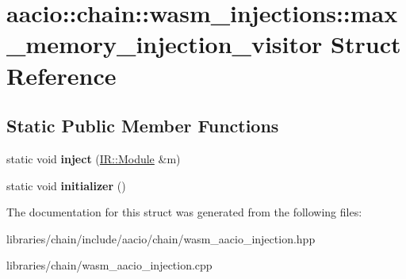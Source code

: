 \hypertarget{structaacio_1_1chain_1_1wasm__injections_1_1max__memory__injection__visitor}{}\section{aacio\+:\+:chain\+:\+:wasm\+\_\+injections\+:\+:max\+\_\+memory\+\_\+injection\+\_\+visitor Struct Reference}
\label{structaacio_1_1chain_1_1wasm__injections_1_1max__memory__injection__visitor}
\subsection*{Static Public Member Functions}
\begin{DoxyCompactItemize}
\item 
\mbox{\label{structaacio_1_1chain_1_1wasm__injections_1_1max__memory__injection__visitor_aaf9c8b57238ba235669a73e03e057e6c}} 
static void {\bfseries inject} (\mbox{\hyperlink{struct_i_r_1_1_module}{I\+R\+::\+Module}} \&m)
\item 
\mbox{\label{structaacio_1_1chain_1_1wasm__injections_1_1max__memory__injection__visitor_a57685045f399e123955fd605998c251b}} 
static void {\bfseries initializer} ()
\end{DoxyCompactItemize}


The documentation for this struct was generated from the following files\+:\begin{DoxyCompactItemize}
\item 
libraries/chain/include/aacio/chain/wasm\+\_\+aacio\+\_\+injection.\+hpp\item 
libraries/chain/wasm\+\_\+aacio\+\_\+injection.\+cpp\end{DoxyCompactItemize}
